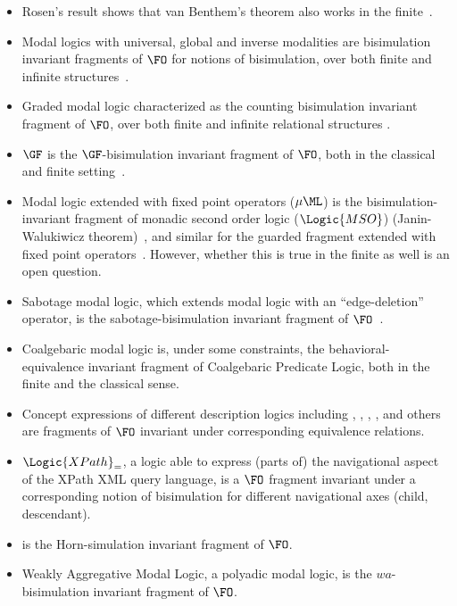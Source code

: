\begin{itemize}
  \item Rosen's result shows that van Benthem's theorem also works in the finite~\cite{Rosen97}.
  \item Modal logics with universal, global and inverse modalities are bisimulation invariant fragments of $\FO$ for notions of bisimulation, over both finite and infinite structures~\cite{Otto04}.
  \item Graded modal logic characterized as the counting bisimulation invariant fragment of $\FO$, over both finite and infinite relational structures \cite{derijke2000,otto2023}.
  \item $\GF$ is the $\GF$-bisimulation invariant fragment of $\FO$, both in the classical~\cite{AndrekaNB98} and finite setting~\cite{Otto2012}.
  \item Modal logic extended with fixed point operators ($\mu\ML$) is the bisimulation-invariant fragment of monadic second order logic ($\Logic{MSO}$) (Janin-Walukiwicz theorem)~\cite{janin1996}, and similar for the guarded fragment extended with fixed point operators~\cite{gradel2002}.
        However, whether this is true in the finite as well is an open question.
  \item Sabotage modal logic, which extends modal logic with an ``edge-deletion'' operator, is the sabotage-bisimulation invariant fragment of $\FO$~\cite{aucher2015}.
  \item Coalgebaric modal logic is, under some constraints, the behavioral-equivalence invariant fragment of Coalgebaric Predicate Logic\cite{litak2012}, both in the finite and the classical sense.
  \item Concept expressions of different description logics including , , , ,  and others are fragments of $\FO$ invariant under corresponding equivalence relations\cite{kurtonina1999, lutz2011, piro2013}.
  \item $\Logic{XPath}_{=}$, a logic able to express (parts of) the navigational aspect of the XPath XML query language, is a $\FO$ fragment invariant under a corresponding notion of bisimulation for different navigational axes (child, descendant)\cite{figueira2015}.
  \item {} is the Horn-simulation invariant fragment of $\FO$\cite{jung2019}.
  \item Weakly Aggregative Modal Logic, a polyadic modal logic, is the $wa$-bisimulation invariant fragment of $\FO$.
\end{itemize}

